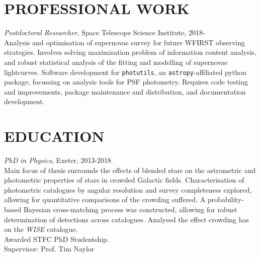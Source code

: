 \documentclass[letter, margin, 10pt]{res} %
\begin{document}
\begin{resume}

 



\section{PROFESSIONAL WORK}

{\sl Postdoctoral Researcher}, Space Telescope Science Institute, 2018-\\
Analysis and optimisation of supernovae survey for future WFIRST observing strategies. Involves solving maximisation problem of information content analysis, and robust statistical analysis of the fitting and modelling of supernovae lightcurves. Software development for \texttt{photutils}, an \texttt{astropy}-affiliated python package, focussing on analysis tools for PSF photometry. Requires code testing and improvements, package maintenance and distribution, and documentation development.

\section{EDUCATION}

{\sl PhD in Physics}, Exeter, 2013-2018\\
Main focus of thesis surrounds the effects of blended stars on the astrometric and photometric properties of stars in crowded Galactic fields. Characterisation of photometric catalogues by angular resolution and survey completeness explored, allowing for quantitative comparisons of the crowding suffered. A probability-based Bayesian cross-matching process was constructed, allowing for robust determination of detections across catalogues. Analysed the effect crowding has on the \textit{WISE} catalogue. \\Awarded STFC PhD Studentship. \\Supervisor: Prof. Tim Naylor


\end{resume}
\end{document}
